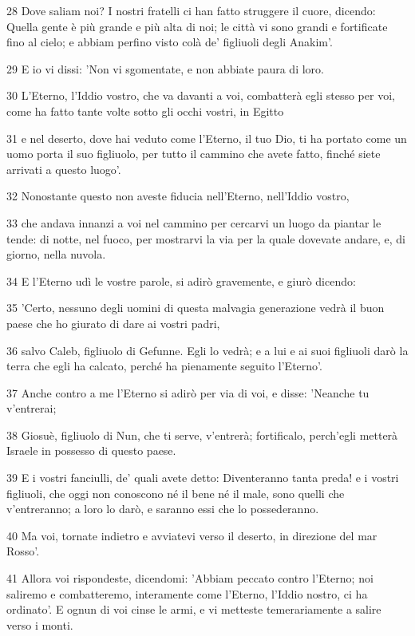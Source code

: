 \par 28 Dove saliam noi? I nostri fratelli ci han fatto struggere il cuore, dicendo: Quella gente è più grande e più alta di noi; le città vi sono grandi e fortificate fino al cielo; e abbiam perfino visto colà de' figliuoli degli Anakim'.
\par 29 E io vi dissi: 'Non vi sgomentate, e non abbiate paura di loro.
\par 30 L'Eterno, l'Iddio vostro, che va davanti a voi, combatterà egli stesso per voi, come ha fatto tante volte sotto gli occhi vostri, in Egitto
\par 31 e nel deserto, dove hai veduto come l'Eterno, il tuo Dio, ti ha portato come un uomo porta il suo figliuolo, per tutto il cammino che avete fatto, finché siete arrivati a questo luogo'.
\par 32 Nonostante questo non aveste fiducia nell'Eterno, nell'Iddio vostro,
\par 33 che andava innanzi a voi nel cammino per cercarvi un luogo da piantar le tende: di notte, nel fuoco, per mostrarvi la via per la quale dovevate andare, e, di giorno, nella nuvola.
\par 34 E l'Eterno udì le vostre parole, si adirò gravemente, e giurò dicendo:
\par 35 'Certo, nessuno degli uomini di questa malvagia generazione vedrà il buon paese che ho giurato di dare ai vostri padri,
\par 36 salvo Caleb, figliuolo di Gefunne. Egli lo vedrà; e a lui e ai suoi figliuoli darò la terra che egli ha calcato, perché ha pienamente seguito l'Eterno'.
\par 37 Anche contro a me l'Eterno si adirò per via di voi, e disse: 'Neanche tu v'entrerai;
\par 38 Giosuè, figliuolo di Nun, che ti serve, v'entrerà; fortificalo, perch'egli metterà Israele in possesso di questo paese.
\par 39 E i vostri fanciulli, de' quali avete detto: Diventeranno tanta preda! e i vostri figliuoli, che oggi non conoscono né il bene né il male, sono quelli che v'entreranno; a loro lo darò, e saranno essi che lo possederanno.
\par 40 Ma voi, tornate indietro e avviatevi verso il deserto, in direzione del mar Rosso'.
\par 41 Allora voi rispondeste, dicendomi: 'Abbiam peccato contro l'Eterno; noi saliremo e combatteremo, interamente come l'Eterno, l'Iddio nostro, ci ha ordinato'. E ognun di voi cinse le armi, e vi metteste temerariamente a salire verso i monti.
